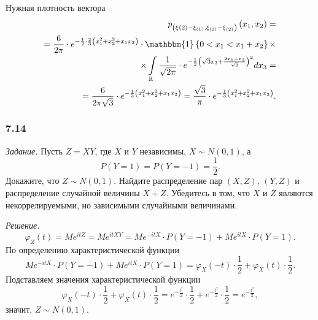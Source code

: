 \begin{enumerate}[label=\alph*)]
  Нужная плотность вектора
  \begin{equation*}
    \begin{split}
      p_{ \left( \xi{ \left( 2 \right) } - \xi_{ \left( 1 \right) }, \xi_{ \left( 3 \right) } - \xi_{ \left( 2 \right) } \right) }
        \left( x_1, x_2 \right) = \\
      = \frac{6}{2 \pi } \cdot e^{- \frac{1}{2} \cdot
      \frac{2}{3} \left( x_1^2 + x_2^2 + x_1 x_2 \right) } \cdot
      \mathbbm{1} \left\{ 0 < x_1 < x_1 + x_2 \right\} \times \\
      \times \int \limits_{ \mathbb{R}}
        \frac{1}{ \sqrt{2 \pi }} \cdot
        e^{- \frac{1}{2} \left( \sqrt{3} x_3 + \frac{2x_1 + x_2}{ \sqrt{3}} \right)^2}
      dx_3 = \\
      = \frac{6}{2 \pi \sqrt{3}} \cdot e^{- \frac{1}{3} \left( x_1^2 + x_2^2 + x_1 x_2 \right) } =
      \frac{ \sqrt{3}}{ \pi } \cdot e^{- \frac{1}{3} \left(x_1^2 + x_2^2 + x_1 x_2 \right) }.
    \end{split}
  \end{equation*}
\end{enumerate}

\subsubsection*{7.14}

\textit{Задание.} Пусть $Z = XY$, где $X$ и $Y$ независимы, $X \sim N \left( 0, 1 \right) $,
а
$$P \left( Y = 1 \right) =
  P \left( Y = -1 \right) =
  \frac{1}{2}.$$
Докажите, что $Z \sim N \left( 0, 1 \right) $.
Найдите распределение пар $ \left( X, Z \right), \, \left( Y, Z \right) $
и распределение случайной величины $X + Z$.
Убедитесь в том, что $X$ и $Z$ являются некоррелируемыми, но зависимыми случайными величинами.

\textit{Решение.}
$$ \varphi_Z \left( t \right) =
  Me^{itZ} =
  Me^{itXY} =
  Me^{-itX} \cdot P \left( Y = -1 \right) + Me^{itX} \cdot P \left( Y = 1 \right).$$
По определению характеристической функции
$$Me^{-itX} \cdot P \left( Y = -1 \right) + Me^{itX} \cdot P \left( Y = 1 \right) =
  \varphi_X \left( -t \right) \cdot \frac{1}{2} + \varphi_X \left( t \right) \cdot \frac{1}{2}.$$
Подставляем значения характеристической функции
$$ \varphi_X \left( -t \right) \cdot \frac{1}{2} + \varphi_X \left( t \right) \cdot \frac{1}{2} =
  e^{- \frac{t^2}{2}} \cdot \frac{1}{2} + e^{- \frac{t^2}{2}} \cdot \frac{1}{2} =
  e^{- \frac{t^2}{2}},$$
значит, $Z \sim N \left( 0, 1 \right) $.

